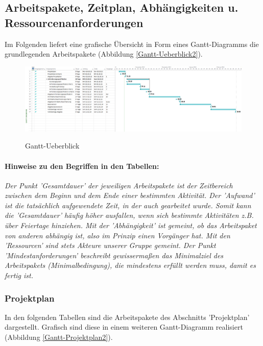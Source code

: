 \documentclass[fontsize=12pt,paper=a4,twoside]{scrartcl}
\begin{document}
\subsection{Arbeitspakete, Zeitplan, Abhängigkeiten u. Ressourcenanforderungen}\label{aps}

Im Folgenden liefert eine grafische Übersicht in Form eines Gantt-Diagramms die grundlegenden Arbeitspakete (Abbildung \ref{Gantt-Ueberblick2}).\\

\begin{figure}[htbp]
\caption{Gantt-Ueberblick}
\includegraphics[angle = 90, scale=0.5]{Gantt-Ueberblick2.png}
\label{Gantt-Ueberblick}
\end{figure}

\paragraph{Hinweise zu den Begriffen in den Tabellen:} \textit{Der Punkt 'Gesamtdauer' der jeweiligen Arbeitspakete ist der Zeitbereich zwischen dem Beginn und dem Ende einer bestimmten Aktivität. Der 'Aufwand' ist die tatsächlich aufgewendete Zeit, in der auch gearbeitet wurde. Somit kann die 'Gesamtdauer' häufig höher ausfallen, wenn sich bestimmte Aktivitäten z.B. über Feiertage hinziehen. Mit der 'Abhängigkeit' ist gemeint, ob das Arbeitspaket von anderen abhängig ist, also im Prinzip einen Vorgänger hat. Mit den 'Ressourcen' sind stets Akteure unserer Gruppe gemeint. Der Punkt 'Mindestanforderungen' beschreibt gewissermaßen das Minimalziel des Arbeitspakets (Minimalbedingung), die mindestens erfüllt werden muss, damit es fertig ist.}\\

\subsubsection{Projektplan}\label{aps}

In den folgenden Tabellen sind die Arbeitspakete des Abschnitts 'Projektplan' dargestellt. Grafisch sind diese in einem weiteren Gantt-Diagramm realisiert (Abbildung \ref{Gantt-Projektplan2}). \\
\end{document}

